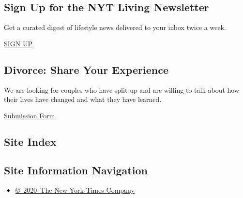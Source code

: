 \hypertarget{sign-up-for-the-nyt-living-newsletter}{%
\subsection{Sign Up for the NYT Living
Newsletter}\label{sign-up-for-the-nyt-living-newsletter}}

Get a curated digest of lifestyle news delivered to your inbox twice a
week.

\href{/newsletters/signup/LI}{SIGN UP}

\hypertarget{divorce-share-your-experience}{%
\subsection{Divorce: Share Your
Experience}\label{divorce-share-your-experience}}

We are looking for couples who have split up and are willing to talk
about how their lives have changed and what they have learned.

\href{http://www.nytimes.com/interactive/2014/style/boomer-divorce.html}{Submission
Form}

\hypertarget{site-index}{%
\subsection{Site Index}\label{site-index}}

\hypertarget{site-information-navigation}{%
\subsection{Site Information
Navigation}\label{site-information-navigation}}

\begin{itemize}
\tightlist
\item
  \href{https://help.nytimes.com/hc/en-us/articles/115014792127-Copyright-notice}{©~2020~The
  New York Times Company}
\end{itemize}


